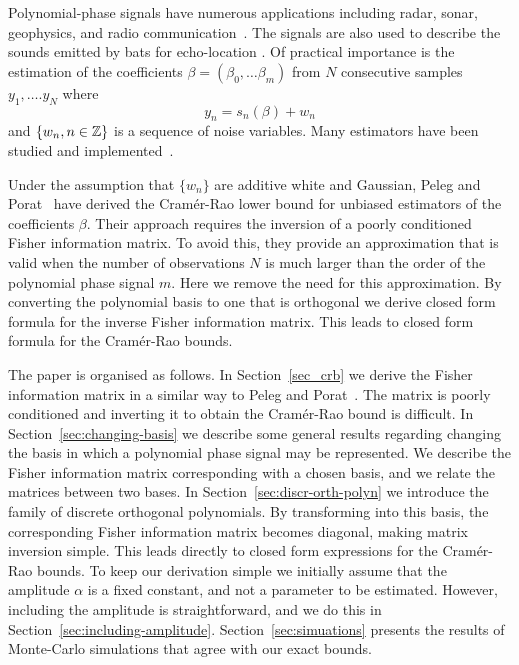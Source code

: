 \documentclass[journal,10pt]{IEEEtran}
\begin{document}
Polynomial-phase signals have numerous applications including radar, sonar, geophysics, and radio communication~\cite{Angeby_estimating_2000}.  The signals are also used to describe the sounds emitted by bats for echo-location \cite{Peleg_DPT_1995}.  Of practical importance is the estimation of the coefficients $\beta = (\beta_0, \dots \beta_m)$ from $N$ consecutive samples $y_1, \dots. y_N$ where 
\[
y_n = s_n(\beta) + w_n
\]
and $\{w_n, n \in {\mathbb Z}\}$ is a sequence of noise variables.  Many estimators have been studied and implemented~\cite{Peleg_DPT_1995, Angeby_estimating_2000, Djuric_phase_unwrap_chirp_1990, Oshea_iterative_1996, Barbarossa_analysis_of_PPS_1997, Slocumb_polynomial_1994, Morelande_bayes_unwrapping_2008, Kitchen_polyphase_unwrapping_1994}.

Under the assumption that $\{w_n\}$ are additive white and Gaussian, Peleg and Porat~\cite{Peleg1991_CRB_PPS_1991} have derived the Cram\'{e}r-Rao lower bound for unbiased estimators of the coefficients $\beta$.  Their approach requires the inversion of a poorly conditioned Fisher information matrix.  To avoid this, they provide an approximation that is valid when the number of observations $N$ is much larger than the order of the polynomial phase signal $m$.  Here we remove the need for this approximation.  By converting the polynomial basis to one that is orthogonal we derive closed form formula for the inverse Fisher information matrix.  This leads to closed form formula for the Cram\'{e}r-Rao bounds.  %

The paper is organised as follows.  In Section~\ref{sec_crb} we derive the Fisher information matrix in a similar way to Peleg and Porat~\cite{Peleg1991_CRB_PPS_1991}.  The matrix is poorly conditioned and inverting it to obtain the Cram\'{e}r-Rao bound is difficult.  In Section~\ref{sec:changing-basis} we describe some general results regarding changing the basis in which a polynomial phase signal may be represented.  We describe the Fisher information matrix corresponding with a chosen basis, and we relate the matrices between two bases.  In Section~\ref{sec:discr-orth-polyn} we introduce the family of discrete orthogonal polynomials.  By transforming into this basis, the corresponding Fisher information matrix becomes diagonal, making matrix inversion simple.  This leads directly to closed form expressions for the Cram\'{e}r-Rao bounds.  To keep our derivation simple we initially assume that the amplitude $\alpha$ is a fixed constant, and not a parameter to be estimated.  However, including the amplitude is straightforward, and we do this in Section~\ref{sec:including-amplitude}.  Section~\ref{sec:simuations} presents the results of Monte-Carlo simulations that agree with our exact bounds.
\end{document}
